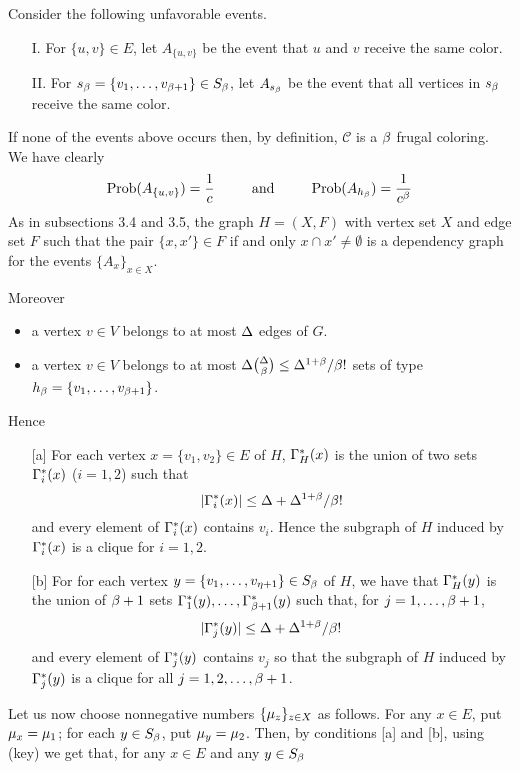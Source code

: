 \documentclass[11pt]{article}
\begin{document}
 Consider the following unfavorable events.
\begin{itemize}
\item[I.]
For $\{u,v\}\in E$, let
$A_{\{u,v\}}$ be the event that $u$ and $v$ receive the same color.
\item[II.]
For
$s_\beta=\{v_1,\dots, v_{\beta+1}\}\in S_{\beta}$,
let $A_{s_{\beta}}$ be the event that all vertices in $s_\beta$ receive the same color.
\end{itemize}
If none of the events above occurs then, by definition, $\mathcal C$ is a $\beta$ frugal coloring. We have clearly
$$
{\rm Prob} (A_{\{u,v\}}) = {1\over c}
~~~~~~~~{\rm and}~~~~~~~~
{\rm Prob} (A_{h_{\beta}}) = {1\over c^\beta}
$$
As in subsections 3.4 and 3.5, the graph $H=(X,F)$  with vertex
set $X$ and edge set $F$ such that
the pair $\{x,x'\}\in F$ if and only  $x\cap x'\neq\emptyset$ is a dependency graph for the events $\{A_x\}_{x\in X}$.


Moreover
\begin{itemize}
\item
a vertex $v\in V$ belongs to at most $\Delta$ edges of $G$.
\item
a vertex $v\in V$ belongs to at most $\Delta {\Delta\choose\beta}\le {\Delta^{1+\beta}/ \beta!}$
sets of type $h_\beta=\{v_1,\dots, v_{\beta+1}\}$.
\end{itemize}

Hence
\begin{itemize}
\item[{[a]}]
For each  vertex $x=\{v_1,v_2\}\in E$ of $H$,
$\Gamma_H^*(x)$ is the union of two sets $\Gamma_i^*(x)$ ($i=1,2$)
such that
$$
|\Gamma_i^*(x)|\le  \Delta + {\Delta^{1+\beta}/ \beta!}
$$
and every element of $\Gamma_i^*(x)$ contains $v_i$.
Hence  the subgraph of $H$  induced by $\Gamma_i^*(x)$ is a clique for $i=1,2$.
\item[{[b]}]
For  for each  vertex $y=\{v_1,\dots,v_{\eta+1}\}\in S_{\beta}$ of $H$, we have that
$\Gamma_H^*(y)$ is the union of $\beta+1$ sets $\Gamma_1^*(y),\dots,\Gamma_{\beta+1}^*(y)$ such that,
for $j=1,\dots,  \beta+1$,
$$
|\Gamma_j^*(y)|\le \Delta +{\Delta^{1+\beta}/ \beta!}
$$
and every element of $\Gamma_{j}^*(y)$ contains $v_j$ so that the subgraph of $H$  induced by $\Gamma_j^*(y)$ is a clique
for all $j=1,2,\dots, \beta+1$.
\end{itemize}



Let us now choose nonnegative  numbers $\{\mu_z\}_{z\in X}$ as follows. For any $x\in E$, put $\mu_{x}=\mu_1$;   for
each $y\in S_\beta$, put $\mu_y=\mu_2$.
Then, by    conditions [a] and [b], using \equ(key) we get that, for any $x\in E$ and any $y\in S_\beta$
\end{document}
